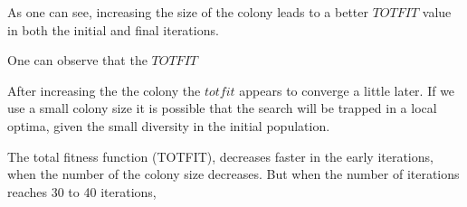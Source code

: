 As one can see, increasing the size of the colony leads to a better $TOTFIT$ value in both the initial and final iterations. 

One can observe that the $TOTFIT$

After increasing the the colony the $totfit$ appears to converge a little later. If we use a small colony size it is possible that the search will be trapped in a local optima, given the small diversity in the initial population.  

 The total fitness function (TOTFIT), decreases faster in the early iterations, when the number of the colony size decreases. But when the number of iterations reaches 30 to 40 iterations, 